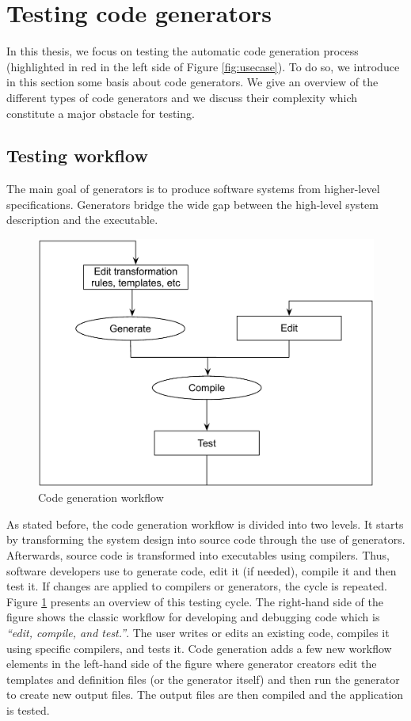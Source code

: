 \section{Testing code generators}
In this thesis, we focus on testing the automatic code generation process (highlighted in red in the left side of Figure \ref{fig:usecase}). To do so, we introduce in this section some basis about code generators. We give an overview of the different types of code generators and we discuss their complexity which constitute a major obstacle for testing.
\subsection{Testing workflow}
The main goal of generators is to produce software systems from higher-level specifications. Generators bridge the wide gap between the high-level system description and the executable.
\begin{figure}[h]
	\center
	\includegraphics[scale=0.7]{Background/fig/workflow}
	\caption{Code generation workflow}
	\label{fig:workflow}
\end{figure}

As stated before, the code generation workflow is divided into two levels. It starts by transforming the system design into source code through the use of generators. Afterwards, source code is transformed into executables using compilers. Thus, software developers use to generate code, edit it (if needed), compile it and then test it. If changes are applied to compilers or generators, the cycle is repeated. Figure \ref{fig:workflow} presents an overview of this testing cycle. The right-hand side of the figure shows the classic workflow for developing and debugging code which is \textit{“edit, compile, and test.”}. The user writes or edits an existing code, compiles it using specific compilers, and tests it. Code generation adds a few new workflow elements in the left-hand side of the figure where generator creators edit the templates and definition files (or the generator itself) and then run the generator to create new output files. The output files are then compiled and the application is tested. 



